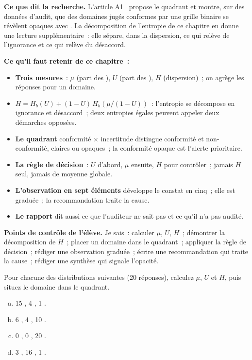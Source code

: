 \begin{boxinfo}
\textbf{Ce que dit la recherche.} L'article A1~\cite{minka2026nek} propose
le quadrant et montre, sur des données d'audit, que des domaines jugés
conformes par une grille binaire se révèlent opaques avec \NEK{}. La
décomposition de l'entropie de ce chapitre en donne une lecture
supplémentaire~: elle sépare, dans la dispersion, ce qui relève de
l'ignorance et ce qui relève du désaccord.
\end{boxinfo}

\separateur

\begin{boxresume}
\textbf{Ce qu'il faut retenir de ce chapitre~:}
\begin{itemize}
    \item \textbf{Trois mesures}~: $\mu$ (part des \OUI{}), $U$ (part des
          \NEK{}), $H$ (dispersion)~; on agrège les réponses pour un domaine.
    \item \textbf{$H = H_b(U) + (1-U)\,H_b(\mu/(1-U))$}~: l'entropie se
          décompose en ignorance et désaccord~; deux entropies égales
          peuvent appeler deux démarches opposées.
    \item \textbf{Le quadrant} conformité × incertitude distingue
          conformité et non-conformité, claires ou opaques~; la conformité
          opaque est l'alerte prioritaire.
    \item \textbf{La règle de décision}~: $U$ d'abord, $\mu$ ensuite, $H$ pour
          contrôler~; jamais $H$ seul, jamais de moyenne globale.
    \item \textbf{L'observation en sept éléments} développe le constat en
          cinq~; elle est graduée~; la recommandation traite la cause.
    \item \textbf{Le rapport} dit aussi ce que l'auditeur ne sait pas et ce
          qu'il n'a pas audité.
\end{itemize}
\end{boxresume}

\begin{boxinfo}
\textbf{Points de contrôle de l'élève.} Je sais~: calculer $\mu$, $U$,
$H$~; démontrer la décomposition de $H$~; placer un domaine dans le
quadrant~; appliquer la règle de décision~; rédiger une observation
graduée~; écrire une recommandation qui traite la cause~; rédiger une
synthèse qui signale l'opacité.
\end{boxinfo}

\bigskip

\begin{boxexo}[title={\ding{45}\quad Exercice~11.1. Calculer et situer \niveaubase}]
Pour chacune des distributions suivantes (20 réponses), calculez $\mu$, $U$
et $H$, puis situez le domaine dans le quadrant.
\begin{enumerate}[(a)]
    \item 15 \OUI{}, 4 \NON{}, 1 \NEK{}.
    \item 6 \OUI{}, 4 \NON{}, 10 \NEK{}.
    \item 0 \OUI{}, 0 \NON{}, 20 \NEK{}.
    \item 3 \OUI{}, 16 \NON{}, 1 \NEK{}.
\end{enumerate}
\end{boxexo}

